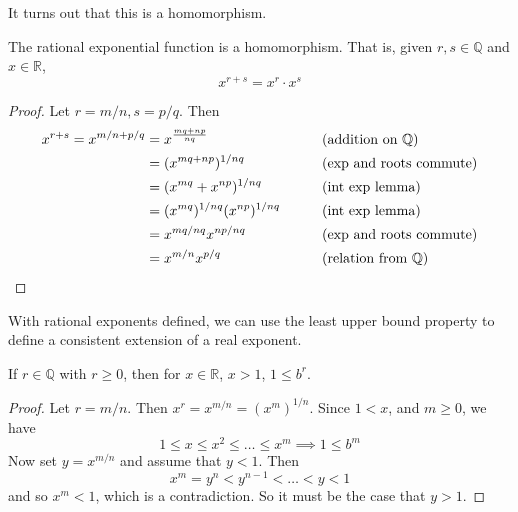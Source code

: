     It turns out that this is a homomorphism. 

    \begin{corollary}
      The rational exponential function is a homomorphism. That is, given $r, s \in \mathbb{Q}$ and $x \in \mathbb{R}$, 
      \begin{equation}
        x^{r + s} = x^r \cdot x^s
      \end{equation}
    \end{corollary}
    \begin{proof}
      Let $r = m/n, s = p/q$. Then 
      \begin{align}
        x^{r+s} = x^{m/n + p/q} & = x^{\frac{mq + np}{nq}} && \tag{addition on $\mathbb{Q}$}\\
                                & = (x^{mq + np})^{1/nq} && \tag{exp and roots commute}\\
                                & = (x^{mq} + x^{np})^{1/nq} && \tag{int exp lemma}\\
                                & = (x^{mq})^{1/nq} (x^{np})^{1/nq} && \tag{int exp lemma}\\
                                & = x^{mq/nq} x^{np/nq} && \tag{exp and roots commute} \\
                                & = x^{m/n} x^{p/q} && \tag{relation from $\mathbb{Q}$}
      \end{align}
    \end{proof}

    With rational exponents defined, we can use the least upper bound property to define a consistent extension of a real exponent. 
    
    \begin{lemma} 
      If $r \in \mathbb{Q}$ with $r \geq 0$, then for $x \in \mathbb{R}$, $x > 1$, $1 \leq b^r$. 
    \end{lemma}
    \begin{proof}
      Let $r = m/n$. Then $x^r = x^{m/n} = (x^m)^{1/n}$. Since $1 < x$, and $m \geq 0$, we have 
      \begin{equation}
        1 \leq x \leq x^2 \leq \ldots \leq x^m \implies 1 \leq b^m
      \end{equation}
      Now set $y = x^{m/n}$ and assume that $y < 1$. Then 
      \begin{equation}
        x^m = y^n < y^{n-1} < \ldots < y < 1
      \end{equation}
      and so $x^m < 1$, which is a contradiction. So it must be the case that $y > 1$. 
    \end{proof}

